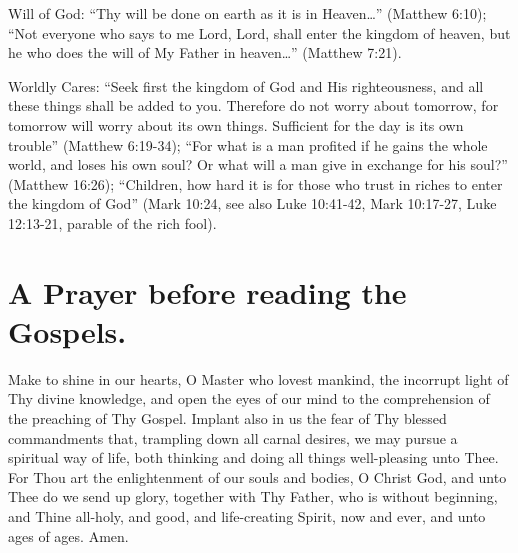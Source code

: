 Will of God: ``Thy will be done on earth as it is in Heaven\ldots '' (Matthew 6:10); ``Not everyone who says to me Lord, Lord, shall enter the kingdom of heaven, but he who does the will of My Father in heaven\ldots '' (Matthew 7:21).

Worldly Cares: ``Seek first the kingdom of God and His righteousness, and all these things shall be added to you. Therefore do not worry about tomorrow, for tomorrow will worry about its own things. Sufficient for the day is its own trouble'' (Matthew 6:19-34); ``For what is a man profited if he gains the whole world, and loses his own soul? Or what will a man give in exchange for his soul?'' (Matthew 16:26); ``Children, how hard it is for those who trust in riches to enter the kingdom of God'' (Mark 10:24, see also Luke 10:41-42, Mark 10:17-27, Luke 12:13-21, parable of the rich fool).

\section{A Prayer before reading the Gospels.}

Make to shine in our hearts, O Master who lovest mankind, the incorrupt light of Thy divine knowledge, and open the eyes of our mind to the comprehension of the preaching of Thy Gospel. Implant also in us the fear of Thy blessed commandments that, trampling down all carnal desires, we may pursue a spiritual way of life, both thinking and doing all things well-pleasing unto Thee. For Thou art the enlightenment of our souls and bodies, O Christ God, and unto Thee do we send up glory, together with Thy Father, who is without beginning, and Thine all-holy, and good, and life-creating Spirit, now and ever, and unto ages of ages. Amen.
